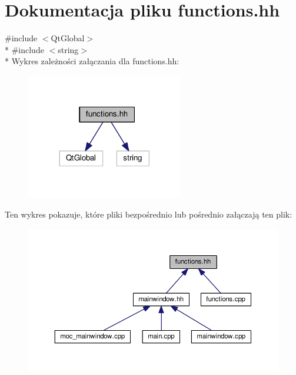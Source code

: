 \hypertarget{functions_8hh}{}\section{Dokumentacja pliku functions.\+hh}
\label{functions_8hh}
{\ttfamily \#include $<$Qt\+Global$>$}\\*
{\ttfamily \#include $<$string$>$}\\*
Wykres zależności załączania dla functions.\+hh\+:\nopagebreak
\begin{figure}[H]
\begin{center}
\leavevmode
\includegraphics[width=194pt]{functions_8hh__incl}
\end{center}
\end{figure}
Ten wykres pokazuje, które pliki bezpośrednio lub pośrednio załączają ten plik\+:\nopagebreak
\begin{figure}[H]
\begin{center}
\leavevmode
\includegraphics[width=350pt]{functions_8hh__dep__incl}
\end{center}
\end{figure}
